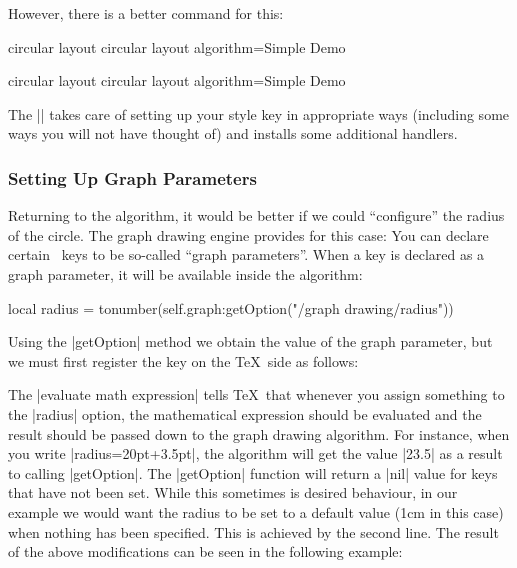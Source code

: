 \begin{codeexample}
\end{codeexample}

However, there is a better command for this:

\begin{codeexample}[code only]
\pgfgddeclarealgorithmkey
{circular layout}
{circular layout}
{algorithm=Simple Demo}
\end{codeexample}
\pgfgddeclarealgorithmkey
{circular layout}
{circular layout}
{algorithm=Simple Demo}

The |\pgfgddeclarealgorithmkey| takes care of setting up your style
key in appropriate ways (including some ways you will not have thought
of) and installs some additional handlers.


\subsubsection{Setting Up Graph Parameters}

Returning to the algorithm, it would be better if we could
``configure'' the radius of the circle. The graph drawing engine
provides for this case: You can declare certain \pgfname\ keys to be
so-called ``graph parameters''. When a key is declared as a graph
parameter, it will be available inside the algorithm: 

\begin{codeexample}
local radius = tonumber(self.graph:getOption("/graph drawing/radius"))
\end{codeexample}

Using the |getOption| method we obtain the value of the
graph parameter, but we must first register the key on the \TeX\ side
as follows: 

\begin{codeexample}
\end{codeexample}

The |evaluate math expression| tells \TeX\ that whenever you assign
something to the |radius| option, the mathematical expression should
be evaluated and the result should be passed down to the graph drawing
algorithm. For instance, when you write |radius=20pt+3.5pt|, the
algorithm will get the value |23.5| as a result to calling
|getOption|. The |getOption| function will return a |nil| value for
keys that have not been set. While this sometimes is desired
behaviour, in our example we would want the radius to be set to a
default value (1cm in this case) when nothing has been specified. This
is achieved by the second line. The result of the above modifications
can be seen in the following example:

